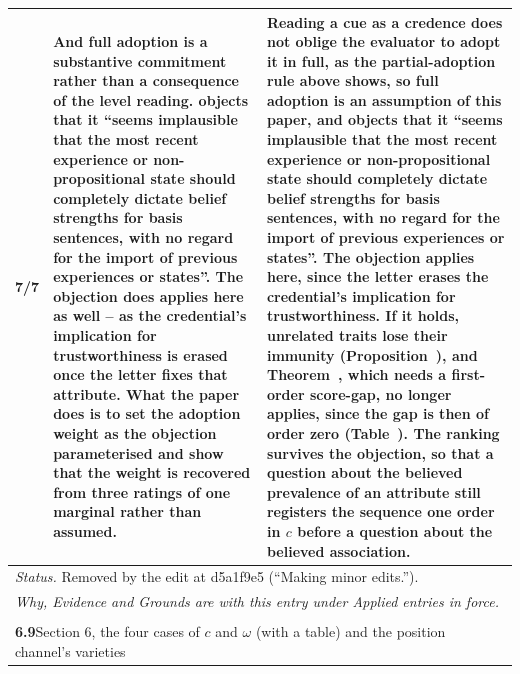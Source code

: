 \documentclass[10pt]{article}
\theoremstyle{definition}
\renewcommand{\ref}[1]{\textsc{\detokenize{#1}}}
\newlength{\fullw}\setlength{\fullw}{25.9cm}
\newcommand{\entryhead}[2]{\multicolumn{3}{|l|}{\rule{0pt}{2.6ex}\large\textbf{#1}\quad #2} \\ \hline}
\begin{document}
{\begin{longtable}{|p{0.9cm}|p{12.2cm}|p{12.2cm}|}
7/7 & And full adoption is a substantive commitment rather than a consequence of the level reading. \citet{Hawthorne2004} objects that it ``seems implausible that the most recent experience or non-propositional state should completely dictate belief strengths for basis sentences, with no regard for the import of previous experiences or states''. The objection does applies here as well -- as the credential's implication for trustworthiness is erased once the letter fixes that attribute. What the paper does is to set the adoption weight as the objection parameterised and show that the weight is recovered from three ratings of one marginal rather than assumed. & Reading a cue as a credence does not oblige the evaluator to adopt it in full, as the partial-adoption rule above shows, so full adoption is an assumption of this paper, and \citet{Hawthorne2004} objects that it ``seems implausible that the most recent experience or non-propositional state should completely dictate belief strengths for basis sentences, with no regard for the import of previous experiences or states''. The objection applies here, since the letter erases the credential's implication for trustworthiness. If it holds, unrelated traits lose their immunity (Proposition~\ref{prop:IMM}), and Theorem~\ref{thm:LOS}, which needs a first-order score-gap, no longer applies, since the gap is then of order zero (Table~\ref{tab:robust}). The ranking survives the objection, so that a question about the believed prevalence of an attribute still registers the sequence one order in $c$ before a question about the believed association. \\ \hline
\multicolumn{3}{|p{\fullw}|}{\textit{Status.} Removed by the edit at d5a1f9e5 (``Making minor edits.'').} \\ \hline
\multicolumn{3}{|p{\fullw}|}{\textit{Why, Evidence and Grounds are with this entry under Applied entries in force.}} \\ \hline
\multicolumn{3}{|l|}{} \\ \hline
\entryhead{6.9}{Section 6, the four cases of $c$ and $\omega$ (with a table) and the position channel's varieties\quad{\footnotesize\textit{(formerly C.27)}}}

\end{longtable}}
\end{document}
